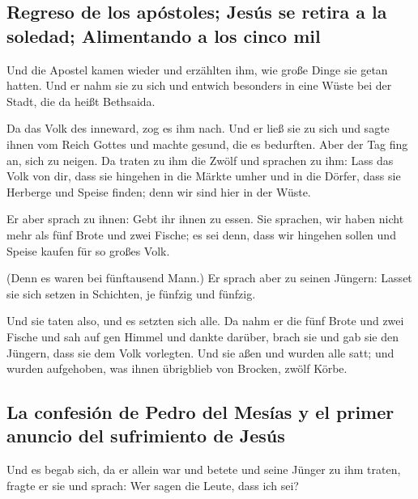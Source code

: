 \hypertarget{regreso-de-los-apuxf3stoles-jesuxfas-se-retira-a-la-soledad-alimentando-a-los-cinco-mil}{%
\subsection{Regreso de los apóstoles; Jesús se retira a la soledad;
Alimentando a los cinco
mil}\label{regreso-de-los-apuxf3stoles-jesuxfas-se-retira-a-la-soledad-alimentando-a-los-cinco-mil}}

 Und die Apostel kamen wieder und erzählten ihm, wie
große Dinge sie getan hatten. Und er nahm sie zu sich und entwich
besonders in eine Wüste bei der Stadt, die da heißt Bethsaida.

 Da das Volk des inneward, zog es ihm nach. Und er ließ
sie zu sich und sagte ihnen vom Reich Gottes und machte gesund, die es
bedurften. Aber der Tag fing an, sich zu neigen.  Da
traten zu ihm die Zwölf und sprachen zu ihm: Lass das Volk von dir, dass
sie hingehen in die Märkte umher und in die Dörfer, dass sie Herberge
und Speise finden; denn wir sind hier in der Wüste.

 Er aber sprach zu ihnen: Gebt ihr ihnen zu essen. Sie
sprachen, wir haben nicht mehr als fünf Brote und zwei Fische; es sei
denn, dass wir hingehen sollen und Speise kaufen für so großes Volk.

 (Denn es waren bei fünftausend Mann.) Er sprach aber zu
seinen Jüngern: Lasset sie sich setzen in Schichten, je fünfzig und
fünfzig.

 Und sie taten also, und es setzten sich alle.
 Da nahm er die fünf Brote und zwei Fische und sah auf
gen Himmel und dankte darüber, brach sie und gab sie den Jüngern, dass
sie dem Volk vorlegten.  Und sie aßen und wurden alle
satt; und wurden aufgehoben, was ihnen übrigblieb von Brocken, zwölf
Körbe.

\hypertarget{la-confesiuxf3n-de-pedro-del-mesuxedas-y-el-primer-anuncio-del-sufrimiento-de-jesuxfas}{%
\subsection{La confesión de Pedro del Mesías y el primer anuncio del
sufrimiento de
Jesús}\label{la-confesiuxf3n-de-pedro-del-mesuxedas-y-el-primer-anuncio-del-sufrimiento-de-jesuxfas}}

 Und es begab sich, da er allein war und betete und seine
Jünger zu ihm traten, fragte er sie und sprach: Wer sagen die Leute,
dass ich sei?

